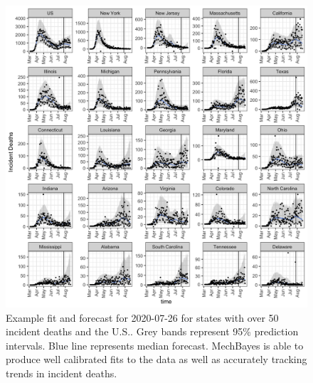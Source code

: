 \documentclass[11pt]{amsart}
\begin{document}
\begin{figure}

    \includegraphics[scale=.2]{fit_and_forecast_results.png}

\caption{Example fit and forecast for 2020-07-26 for states with over 50 incident deaths and the U.S.. Grey bands represent 95\% prediction intervals. Blue line represents median forecast. MechBayes is able to produce well calibrated fits to the data as well as accurately tracking trends in incident deaths.}
\label{fig:fit_and_forecast_results}
\end{figure}

	
 
\end{document}
